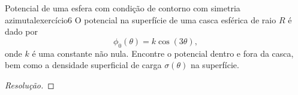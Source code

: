 \begin{exercício}{Potencial de uma esfera com condição de contorno com simetria azimutal}{exercício6}
    O potencial na superfície de uma casca esférica de raio \(R\) é dado por
    \begin{equation*}
        \phi_0(\theta) = k \cos(3\theta),
    \end{equation*}
    onde \(k\) é uma constante não nula. Encontre o potencial dentro e fora da casca, bem como a densidade superficial de carga \(\sigma(\theta)\) na superfície.
\end{exercício}
\begin{proof}[Resolução]

\end{proof}
